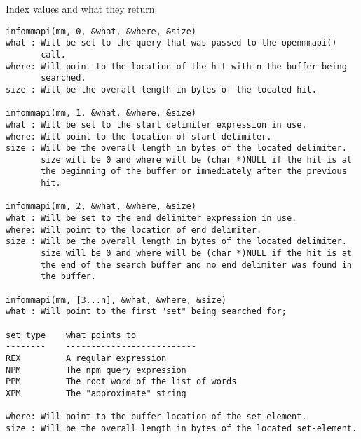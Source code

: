 Index values and what they return:
\begin{verbatim}
infommapi(mm, 0, &what, &where, &size)
what : Will be set to the query that was passed to the openmmapi()
       call.
where: Will point to the location of the hit within the buffer being
       searched.
size : Will be the overall length in bytes of the located hit.

infommapi(mm, 1, &what, &where, &size)
what : Will be set to the start delimiter expression in use.
where: Will point to the location of start delimiter.
size : Will be the overall length in bytes of the located delimiter.
       size will be 0 and where will be (char *)NULL if the hit is at
       the beginning of the buffer or immediately after the previous
       hit.

infommapi(mm, 2, &what, &where, &size)
what : Will be set to the end delimiter expression in use.
where: Will point to the location of end delimiter.
size : Will be the overall length in bytes of the located delimiter.
       size will be 0 and where will be (char *)NULL if the hit is at
       the end of the search buffer and no end delimiter was found in
       the buffer.

infommapi(mm, [3...n], &what, &where, &size)
what : Will point to the first "set" being searched for;

set type    what points to
--------    --------------------------
REX         A regular expression
NPM         The npm query expression
PPM         The root word of the list of words
XPM         The "approximate" string

where: Will point to the buffer location of the set-element.
size : Will be the overall length in bytes of the located set-element.

\end{verbatim}

